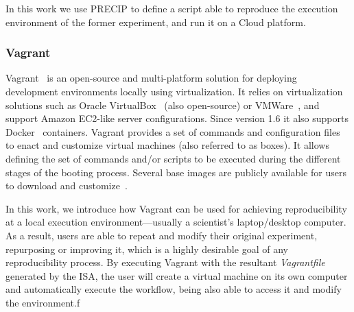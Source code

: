 In this work we use PRECIP to define a script able to reproduce the execution environment of the 
former experiment, and run it on a Cloud platform.

\subsubsection{Vagrant}

Vagrant~\cite{palat2012introducing} is an open-source and multi-platform solution for deploying 
development environments locally using virtualization. It relies on virtualization solutions such as 
Oracle VirtualBox~\cite{Watson2008} (also open-source) or  VMWare~\cite{vmware}, and support 
Amazon EC2-like server configurations. Since version 1.6 it also supports Docker~\cite{Merkel2014} 
containers.
Vagrant provides a set of commands and configuration files to enact and customize virtual machines
(also referred to as boxes). It allows defining the set of commands and/or scripts to be executed during 
the different stages of the booting process. Several base images are publicly available for users to 
download and customize~\cite{vagrantbox}. 
 
In this work, we introduce how Vagrant can be used for achieving reproducibility at a local execution
environment---usually a scientist's laptop/desktop computer. As a result, users are able to repeat and 
modify their original experiment, repurposing or improving it, which is a highly desirable goal of any 
reproducibility process. By executing Vagrant with the resultant {\it Vagrantfile} generated by the ISA, 
the user will create a virtual machine on its own computer and automatically execute the workflow, 
being also able to access it and modify the environment.f




